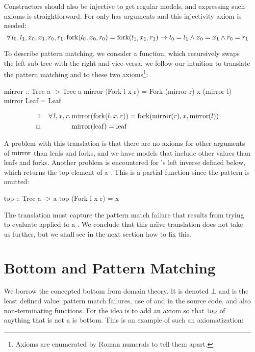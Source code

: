 Constructors should also be injective to get regular models, and
expressing such axioms is straightforward. For  only  has
arguments and this injectivity axiom is needed:
\begin{equation*}
\forall \, l_0 , l_1 , x_0 , x_1 , r_0 , r_1 . \, \mathrm{fork}(l_0,x_0,r_0) =
\mathrm{fork}(l_1,x_1,r_1) \rightarrow l_0 = l_1 \wedge x_0 = x_1 \wedge r_0 = r_1
\end{equation*}

To describe pattern matching, we consider a  function,
which recursively swaps the left sub tree with the right and
vice-versa, we follow our intuition to translate the pattern matching
and to these two axioms\footnote {Axioms are enumerated by Roman
  numerals to tell them apart.}:

\begin{code}
mirror :: Tree a -> Tree a
mirror (Fork l x r) = Fork (mirror r) x (mirror l)
mirror Leaf         = Leaf
\end{code}
\begin{align*}
\rom{1} && \faaa{l}{x}{r} & \fn{mirror}(\fn{fork}(l,x,r)) \eq \fn{fork}(\fn{mirror}(r),x,\fn{mirror}(l)) \\
\rom{2} &&                & \fn{mirror}(\fn{leaf}) \eq \fn{leaf}
\end{align*}

\noindent
A problem with this translation is that there are no axioms for other
arguments of $\mathrm{mirror}$ than leafs and forks, and we have models that
include other values than leafs and forks. Another problem is
encountered for 's left inverse  defined below,
which returns the top element of a . This is a partial
function since the  pattern is omitted:

\begin{code}
top :: Tree a -> a
top (Fork l x r) = x
\end{code}

The translation must capture the pattern match failure that results
from trying to evaluate  applied to a . We conclude
that this na\"{\i}ve translation does not take us further, but we
shall see in the next section how to fix this.

\section{Bottom and Pattern Matching}

We borrow the concepted bottom from domain theory. It is denoted
$\bot$ and is the least defined value: pattern match failures, use of
 and  in the source code, and also
non-terminating functions. For  the idea is to add an axiom so
that $\mathrm{top}$ of anything that is not a  is bottom. This is
an example of such an axiomatization:

